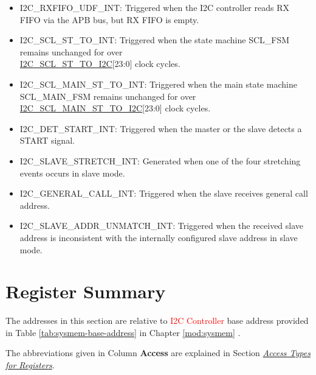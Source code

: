 \documentclass[main\_\_EN.tex]{subfiles}
\begin{document}
\begin{itemize}
    \item \label{int:i2c-rxfifo-udf}I2C\_RXFIFO\_UDF\_INT: Triggered when the I2C controller reads RX FIFO via the APB bus, but RX FIFO is empty.
    \item \label{int:i2c-scl-fsm}I2C\_SCL\_ST\_TO\_INT: Triggered when the state machine SCL\_FSM remains unchanged for over \\\hyperref[fielddesc:I2CSCLSTTOI2C]{I2C\_SCL\_ST\_TO\_I2C}[23:0] clock cycles.
    \item \label{int:i2c-scl-main-fsm}I2C\_SCL\_MAIN\_ST\_TO\_INT: Triggered when the main state machine SCL\_MAIN\_FSM remains unchanged for over \hyperref[fielddesc:I2CSCLMAINSTTOI2C]{I2C\_SCL\_MAIN\_ST\_TO\_I2C}[23:0] clock cycles.
    \item \label{int:i2c-start}I2C\_DET\_START\_INT: Triggered when the master or the slave detects a START signal.
    \item \label{int:i2c-slave-stretch}I2C\_SLAVE\_STRETCH\_INT: Generated when one of the four stretching events occurs in slave mode.
    \item \label{int:i2c-general-call}I2C\_GENERAL\_CALL\_INT: Triggered when the slave receives general call address.
    \item \label{int:i2c-slave-addr-unmatch}I2C\_SLAVE\_ADDR\_UNMATCH\_INT: Triggered when the received slave address is inconsistent with the internally configured slave address in slave mode.
\end{itemize}





\clearpage
\section{Register Summary}

\label{sec:i2c-reg-summ}
\hypertarget{i2c-reg-summ}{}

The addresses in this section are relative to \textcolor{red}{I2C Controller} base address provided in Table \ref{tab:sysmem-base-address} in Chapter \ref{mod:sysmem} \textit{}.

The abbreviations given in Column \textbf{Access} are explained in Section \hyperref[glossary-access-types]{\textit{Access Types for Registers}}.
\end{document}
